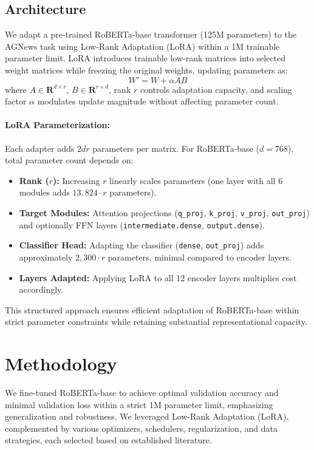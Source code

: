 \documentclass[letterpaper]{article}
\begin{document}
\subsection{Architecture}
We adapt a pre-trained RoBERTa-base transformer (125M parameters) to the AGNews task using Low-Rank Adaptation (LoRA) within a 1M trainable parameter limit. LoRA introduces trainable low-rank matrices into selected weight matrices while freezing the original weights, updating parameters as:
\[
W' = W + \alpha AB
\]
where $A \in \mathbf{R}^{d \times r}$, $B \in \mathbf{R}^{r \times d}$, rank $r$ controls adaptation capacity, and scaling factor $\alpha$ modulates update magnitude without affecting parameter count.

\paragraph{LoRA Parameterization:}
Each adapter adds $2dr$ parameters per matrix. For RoBERTa-base ($d=768$), total parameter count depends on:
\begin{itemize}
    \item \textbf{Rank ($r$):} Increasing $r$ linearly scales parameters (one layer with all 6 modules adds $13,824\cdot r$ parameters).
    \item \textbf{Target Modules:} Attention projections (\texttt{q\_proj}, \texttt{k\_proj}, \texttt{v\_proj}, \texttt{out\_proj}) and optionally FFN layers (\texttt{intermediate.dense}, \texttt{output.dense}).
    \item \textbf{Classifier Head:} Adapting the classifier (\texttt{dense}, \texttt{out\_proj}) adds approximately $2,300\cdot r$ parameters, minimal compared to encoder layers.
    \item \textbf{Layers Adapted:} Applying LoRA to all 12 encoder layers multiplies cost accordingly.
\end{itemize}

This structured approach ensures efficient adaptation of RoBERTa-base within strict parameter constraints while retaining substantial representational capacity.

\section{Methodology}

We fine-tuned RoBERTa-base to achieve optimal validation accuracy and minimal validation loss within a strict 1M parameter limit, emphasizing generalization and robustness. We leveraged Low-Rank Adaptation (LoRA), complemented by various optimizers, schedulers, regularization, and data strategies, each selected based on established literature.
\end{document}
